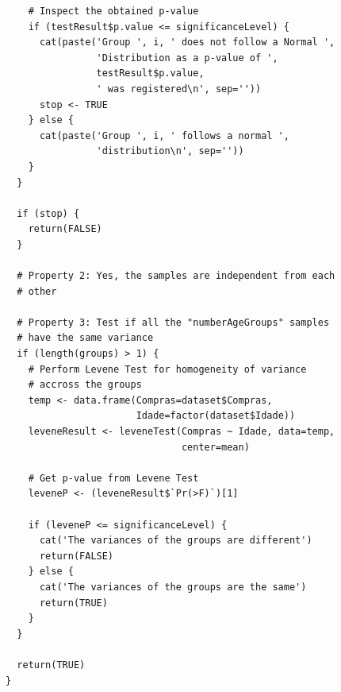 \documentclass[12pt]{article}
\begin{document}
\begin{lstlisting}
    # Inspect the obtained p-value
    if (testResult$p.value <= significanceLevel) {
      cat(paste('Group ', i, ' does not follow a Normal ',
                'Distribution as a p-value of ',
                testResult$p.value,
                ' was registered\n', sep=''))
      stop <- TRUE
    } else {
      cat(paste('Group ', i, ' follows a normal ',
                'distribution\n', sep=''))
    }
  }
  
  if (stop) {
    return(FALSE) 
  }

  # Property 2: Yes, the samples are independent from each
  # other

  # Property 3: Test if all the "numberAgeGroups" samples
  # have the same variance
  if (length(groups) > 1) {
    # Perform Levene Test for homogeneity of variance
    # accross the groups
    temp <- data.frame(Compras=dataset$Compras,
                       Idade=factor(dataset$Idade))
    leveneResult <- leveneTest(Compras ~ Idade, data=temp,
                               center=mean)

    # Get p-value from Levene Test
    leveneP <- (leveneResult$`Pr(>F)`)[1]

    if (leveneP <= significanceLevel) {
      cat('The variances of the groups are different')
      return(FALSE)
    } else {
      cat('The variances of the groups are the same')
      return(TRUE)
    }
  }

  return(TRUE)
}
\end{lstlisting}
\end{document}
